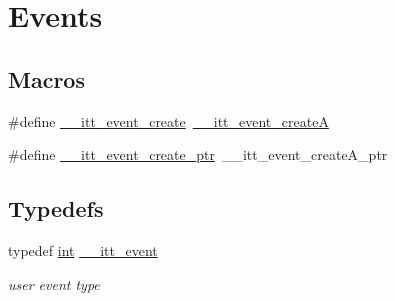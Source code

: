 \hypertarget{group__legacy__events}{\section{Events}
\label{group__legacy__events}
}
\subsection*{Macros}
\begin{DoxyCompactItemize}
\item 
\#define \hyperlink{group__legacy__events_ga6047262ecd47411ed590bd073f9e4da0}{\-\_\-\-\_\-itt\-\_\-event\-\_\-create}~\hyperlink{group__legacy__events_ga6de94d8c80ce1289fc90a4d4154e4538}{\-\_\-\-\_\-itt\-\_\-event\-\_\-create\-A}
\item 
\#define \hyperlink{group__legacy__events_ga89cc719b31bd37bcb563754a9c9e7f8d}{\-\_\-\-\_\-itt\-\_\-event\-\_\-create\-\_\-ptr}~\-\_\-\-\_\-itt\-\_\-event\-\_\-create\-A\-\_\-ptr
\end{DoxyCompactItemize}
\subsection*{Typedefs}
\begin{DoxyCompactItemize}
\item 
typedef \hyperlink{ittnotify__static_8h_a8b8dcd723308a8cb5d84277c7a3fff70}{int} \hyperlink{group__legacy__events_gaf3abb988e507916595fa4a13f5a524e4}{\-\_\-\-\_\-itt\-\_\-event}
\begin{DoxyCompactList}\small\item\em user event type \end{DoxyCompactList}\end{DoxyCompactItemize}
